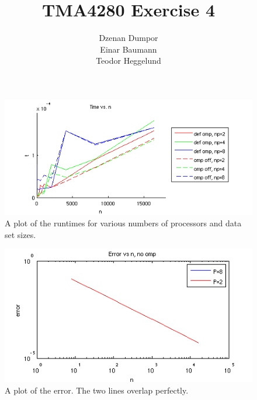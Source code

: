 


\author{Dzenan Dumpor \\ Einar Baumann \\ Teodor Heggelund}
\title{TMA4280 Exercise 4}


\maketitle


\begin{figure}[htbp]
  \centering
  \includegraphics[]{graphics/runtime.png}
  \caption{A plot of the runtimes for various numbers of processors and data set sizes.}
  \label{fig:runtime}
\end{figure}

\begin{figure}[htbp]
  \centering
  \includegraphics[]{graphics/error.png}
  \caption{A plot of the error. The two lines overlap perfectly.}
  \label{fig:error}
\end{figure}



